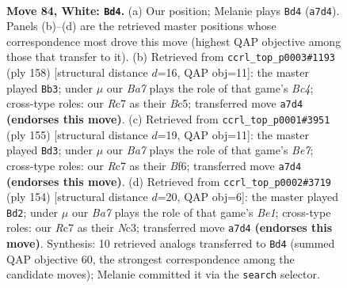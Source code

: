 \documentclass[11pt]{article}
\begin{document}
\clearpage

\begin{figure}[p]\centering
\begin{subfigure}{0.46\textwidth}\centering
\resizebox{\linewidth}{!}{%
\newchessgame
\chessboard[
  setfen={6k1/B1R5/r7/8/4p2p/1K3p1P/5P2/8 w - - 2 84},
  showmover=false,
  pgfstyle=straightmove, color=movearrow, markmove={a7-d4}
]}
\caption{}
\end{subfigure}\hfill
\begin{subfigure}{0.46\textwidth}\centering
\resizebox{\linewidth}{!}{%
\newchessgame
\chessboard[
  setfen={8/8/5k2/2B5/r1B3p1/6Pp/5K1P/8 w - - 8 80},
  showmover=false,
  pgfstyle=straightmove, color=movearrow, markmove={c4-b3}
]}
\caption{}
\end{subfigure}
\\[4pt]
\begin{subfigure}{0.46\textwidth}\centering
\resizebox{\linewidth}{!}{%
\newchessgame
\chessboard[
  setfen={1k6/6p1/1P3b2/P4P2/5K1p/8/2R1b3/8 b - - 5 78},
  showmover=false,
  pgfstyle=straightmove, color=movearrow, markmove={e2-d3}
]}
\caption{}
\end{subfigure}\hfill
\begin{subfigure}{0.46\textwidth}\centering
\resizebox{\linewidth}{!}{%
\newchessgame
\chessboard[
  setfen={8/6k1/5p2/4pP2/2p3P1/2N2K2/8/r3B3 w - - 10 78},
  showmover=false,
  pgfstyle=straightmove, color=movearrow, markmove={e1-d2}
]}
\caption{}
\end{subfigure}
\caption{\textbf{Move 84, White: \texttt{Bd4}.} (a) Our position; Melanie plays \texttt{Bd4} (\texttt{a7d4}). Panels (b)--(d) are the retrieved master positions whose correspondence most drove this move (highest QAP objective among those that transfer to it). (b) Retrieved from \texttt{ccrl\_top\_p0003\#1193} (ply 158) [structural distance $d$=16, QAP obj=11]: the master played \texttt{Bb3}; under $\mu$ our \emph{Ba7} plays the role of that game's \emph{Bc4}; cross-type roles: our \emph{R}c7 as their \emph{B}c5; transferred move \texttt{a7d4} \textbf{(endorses this move)}. (c) Retrieved from \texttt{ccrl\_top\_p0001\#3951} (ply 155) [structural distance $d$=19, QAP obj=11]: the master played \texttt{Bd3}; under $\mu$ our \emph{Ba7} plays the role of that game's \emph{Be7}; cross-type roles: our \emph{R}c7 as their \emph{B}f6; transferred move \texttt{a7d4} \textbf{(endorses this move)}. (d) Retrieved from \texttt{ccrl\_top\_p0002\#3719} (ply 154) [structural distance $d$=20, QAP obj=6]: the master played \texttt{Bd2}; under $\mu$ our \emph{Ba7} plays the role of that game's \emph{Be1}; cross-type roles: our \emph{R}c7 as their \emph{N}c3; transferred move \texttt{a7d4} \textbf{(endorses this move)}. Synthesis: 10 retrieved analogs transferred to \texttt{Bd4} (summed QAP objective 60, the strongest correspondence among the candidate moves); Melanie committed it via the \texttt{search} selector.}
\label{fig:thought-m166}
\end{figure}
\end{document}
